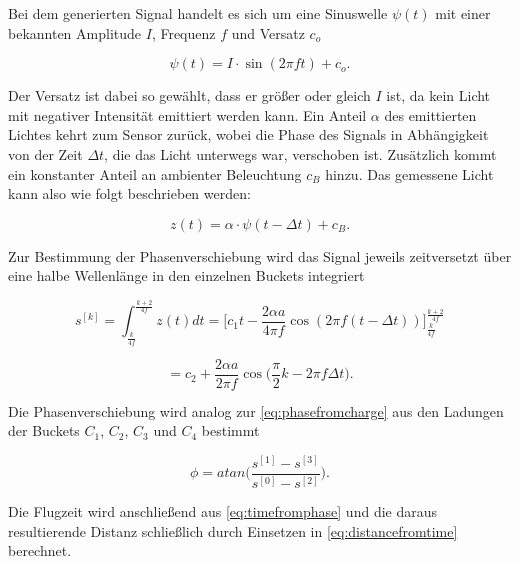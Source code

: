 \documentclass[thesis.tex]{subfiles}
\begin{document}
Bei dem generierten Signal handelt es sich um eine Sinuswelle $\psi(t)$ mit einer bekannten Amplitude $I$, Frequenz $f$ und Versatz $c_o$

\begin{equation}\psi(t) = I \cdot \sin(2\pi f t) + c_o.\end{equation}

Der Versatz ist dabei so gewählt, dass er größer oder gleich $I$ ist, da kein Licht mit negativer Intensität emittiert werden kann. Ein Anteil $\alpha$ des emittierten Lichtes kehrt zum Sensor zurück, wobei die Phase des Signals in Abhängigkeit von der Zeit $\Delta t$, die das Licht unterwegs war, verschoben ist. Zusätzlich kommt ein konstanter Anteil an ambienter Beleuchtung $c_B$ hinzu. Das gemessene Licht kann also wie folgt beschrieben werden:

\begin{equation}z(t) = \alpha \cdot \psi(t - \Delta t) + c_B.\end{equation}

Zur Bestimmung der Phasenverschiebung wird das Signal jeweils zeitversetzt über eine halbe Wellenlänge in den einzelnen Buckets integriert

\begin{equation}s^{[k]}=\int_{\frac{k}{4f}}^{\frac{k+2}{4f}}z(t)dt=\Big[c_1t-\frac{2\alpha a}{4\pi f}\cos(2\pi f(t-\Delta t))\Big]_{\frac{k}{4f}}^{\frac{k+2}{4f}}\end{equation}

\begin{equation}=c_2+\frac{2\alpha a}{2\pi f} \cos\Big(\frac{\pi}{2}k-2\pi f \Delta t\Big).\end{equation}

Die Phasenverschiebung wird analog zur \autoref{eq:phasefromcharge} aus den Ladungen der Buckets $C_1$, $C_2$, $C_3$ und $C_4$ bestimmt

\begin{equation}\phi = atan\Big(\frac{s^{[1]} - s^{[3]}}{s^{[0]} - s^{[2]}}\Big).\label{eq:sin_phase_calculation}\end{equation}

Die Flugzeit wird anschließend aus \autoref{eq:timefromphase} und die daraus resultierende Distanz schließlich durch Einsetzen in \autoref{eq:distancefromtime} berechnet.
\end{document}
